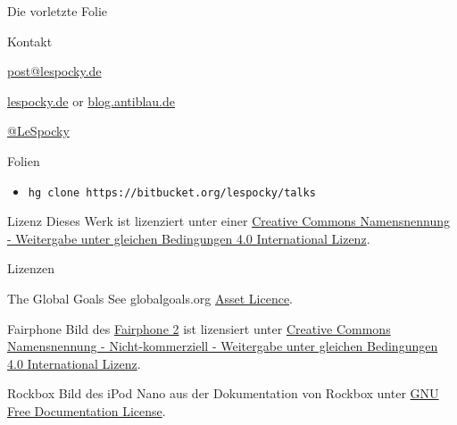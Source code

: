 \documentclass[t]{beamer}
\begin{document}
\begin{frame}{Die vorletzte Folie}
    \begin{block}{Kontakt}
        \begin{description}[Twitter]
            \item [E-Mail] \href{mailto:post@lespocky.de}{post@lespocky.de}
            \item [WWW] \href{http://www.lespocky.de/}{lespocky.de} or
                    \href{http://blog.antiblau.de/}{blog.antiblau.de}
            \item [Twitter] \href{https://twitter.com/LeSpocky}{@LeSpocky}
        \end{description}
    \end{block}
    \begin{block}{Folien}
        \begin{itemize}
            \item \texttt{hg clone https://bitbucket.org/lespocky/talks}
        \end{itemize}
    \end{block}
    \begin{block}{Lizenz}
        Dieses Werk ist lizenziert unter einer
        \href{http://creativecommons.org/licenses/by-sa/4.0/}{Creative Commons
        Namensnennung - Weitergabe unter gleichen Bedingungen 4.0 International
        Lizenz}.
    \end{block}
\end{frame}

\begin{frame}{Lizenzen}
    \begin{block}{The Global Goals}
        See globalgoals.org
        \href{https://www.globalgoals.org/asset-licence}{Asset Licence}.
    \end{block}
    \begin{block}{Fairphone}
        Bild des \href{https://shop.fairphone.com/de/}{Fairphone 2} ist
        lizensiert unter
        \href{https://creativecommons.org/licenses/by-nc-sa/4.0/}{Creative
        Commons Namensnennung - Nicht-kommerziell - Weitergabe unter
        gleichen Bedingungen 4.0 International Lizenz}.
    \end{block}
    \begin{block}{Rockbox}
        Bild des iPod Nano aus der Dokumentation von Rockbox unter
        \href{https://download.rockbox.org/daily/manual/rockbox-ipodnano2g/rockbox-buildap9.html}{GNU Free Documentation License}.
    \end{block}
\end{frame}
\end{document}
